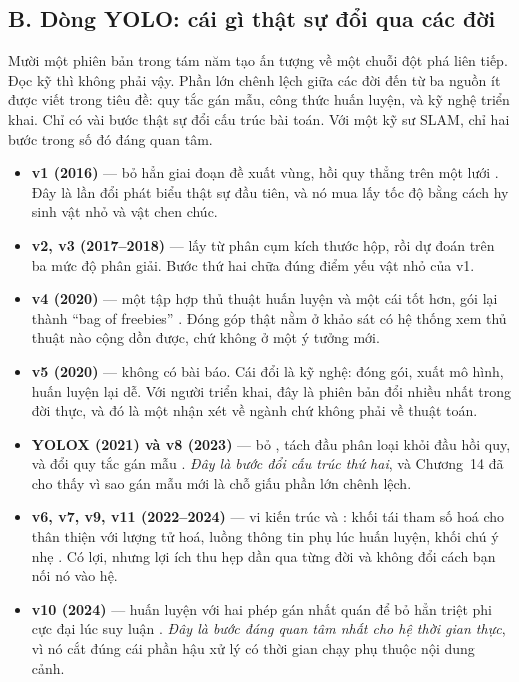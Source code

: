 \documentclass[../../deep_learning.tex]{subfiles}
\begin{document}
\subsection{B. Dòng YOLO: cái gì thật sự đổi qua các đời}
Mười một phiên bản trong tám năm tạo ấn tượng về một chuỗi đột phá liên tiếp. Đọc kỹ thì không phải vậy. Phần lớn chênh lệch giữa các đời đến từ ba nguồn ít được viết trong tiêu đề: quy tắc gán mẫu, công thức huấn luyện, và kỹ nghệ triển khai. Chỉ có vài bước thật sự đổi cấu trúc bài toán. Với một kỹ sư SLAM, chỉ hai bước trong số đó đáng quan tâm.

\begin{itemize}
\item \textbf{v1 (2016)} --- bỏ hẳn giai đoạn đề xuất vùng, hồi quy thẳng trên một lưới \cite{redmon2016yolo}. Đây là lần đổi phát biểu thật sự đầu tiên, và nó mua lấy tốc độ bằng cách hy sinh vật nhỏ và vật chen chúc.
\item \textbf{v2, v3 (2017--2018)} ---  lấy từ phân cụm kích thước hộp, rồi dự đoán trên ba mức độ phân giải. Bước thứ hai chữa đúng điểm yếu vật nhỏ của v1.
\item \textbf{v4 (2020)} --- một tập hợp thủ thuật huấn luyện và một cái  tốt hơn, gói lại thành ``bag of freebies'' \cite{bochkovskiy2020yolov4}. Đóng góp thật nằm ở khảo sát có hệ thống xem thủ thuật nào cộng dồn được, chứ không ở một ý tưởng mới.
\item \textbf{v5 (2020)} --- không có bài báo. Cái đổi là kỹ nghệ: đóng gói, xuất mô hình, huấn luyện lại dễ. Với người triển khai, đây là phiên bản đổi nhiều nhất trong đời thực, và đó là một nhận xét về ngành chứ không phải về thuật toán.
\item \textbf{YOLOX (2021) và v8 (2023)} --- bỏ , tách đầu phân loại khỏi đầu hồi quy, và đổi quy tắc gán mẫu \cite{ge2021yolox}. \emph{Đây là bước đổi cấu trúc thứ hai}, và Chương~14 đã cho thấy vì sao gán mẫu mới là chỗ giấu phần lớn chênh lệch.
\item \textbf{v6, v7, v9, v11 (2022--2024)} --- vi kiến trúc  và : khối tái tham số hoá cho thân thiện với lượng tử hoá, luồng thông tin phụ lúc huấn luyện, khối chú ý nhẹ \cite{wang2023yolov7}. Có lợi, nhưng lợi ích thu hẹp dần qua từng đời và không đổi cách bạn nối nó vào hệ.
\item \textbf{v10 (2024)} --- huấn luyện với hai phép gán nhất quán để bỏ hẳn triệt phi cực đại lúc suy luận \cite{wang2024yolov10}. \emph{Đây là bước đáng quan tâm nhất cho hệ thời gian thực}, vì nó cắt đúng cái phần hậu xử lý có thời gian chạy phụ thuộc nội dung cảnh.
\end{itemize}
\end{document}
